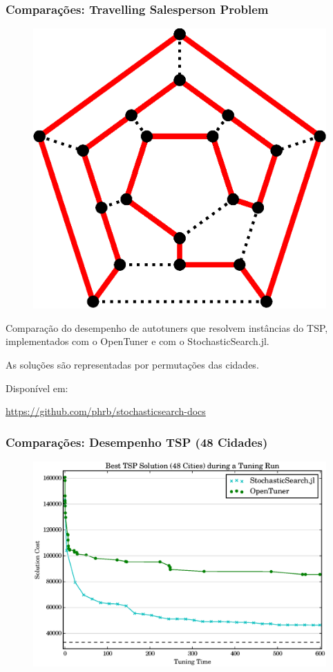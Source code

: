 \documentclass[10pt, compress]{beamer}
\begin{document}
\begin{frame}[fragile]
    \frametitle{Comparações: Travelling Salesperson Problem}
    \begin{figure}[H]
        \centering
        \includegraphics[width=.33\textwidth]{hamiltonianpath}
    \end{figure}%
    Comparação do desempenho de \alert{autotuners} que resolvem
    instâncias do TSP, implementados com o OpenTuner e com o 
    StochasticSearch.jl.

    As soluções são representadas por \alert{permutações} das cidades.

    Disponível em: 
    
    \url{https://github.com/phrb/stochasticsearch-docs}
\end{frame}

\begin{frame}[fragile]
    \frametitle{Comparações: Desempenho TSP (48 Cidades)}
    \begin{figure}[H]
        \centering
        \includegraphics[width=1\textwidth]{att48_10min_best_comparison}
    \end{figure}%
\end{frame}
\end{document}
